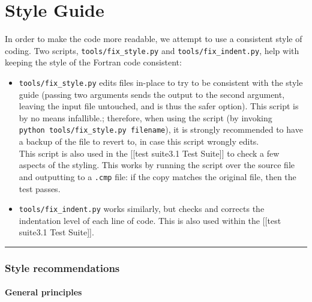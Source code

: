 \chapter{Style Guide}

In order to make the code more readable, we attempt to use a consistent
style of coding. Two scripts, \texttt{tools/fix\_style.py} and
\texttt{tools/fix\_indent.py}, help with keeping the style of the
Fortran code consistent:

\begin{itemize}
\item
  \texttt{tools/fix\_style.py} edits files in-place to try to be
  consistent with the style guide (passing two arguments sends the
  output to the second argument, leaving the input file untouched, and
  is thus the safer option). This script is by no means infallible.;
  therefore, when using the script (by invoking
  \texttt{python\ tools/fix\_style.py\ filename}), it is strongly
  recommended to have a backup of the file to revert to, in case this
  script wrongly edits.\\
  This script is also used in the {[}{[}test suite\textbar{}3.1 Test
  Suite{]}{]} to check a few aspects of the styling. This works by
  running the script over the source file and outputting to a
  \texttt{.cmp} file: if the copy matches the original file, then the
  test passes.
\item
  \texttt{tools/fix\_indent.py} works similarly, but checks and corrects
  the indentation level of each line of code. This is also used within
  the {[}{[}test suite\textbar{}3.1 Test Suite{]}{]}.
\end{itemize}

\begin{center}\rule{0.5\linewidth}{\linethickness}\end{center}

\hypertarget{style-recommendations}{%
\subsection{Style recommendations}\label{style-recommendations}}

\hypertarget{general-principles}{%
\subsubsection{General principles}\label{general-principles}}

